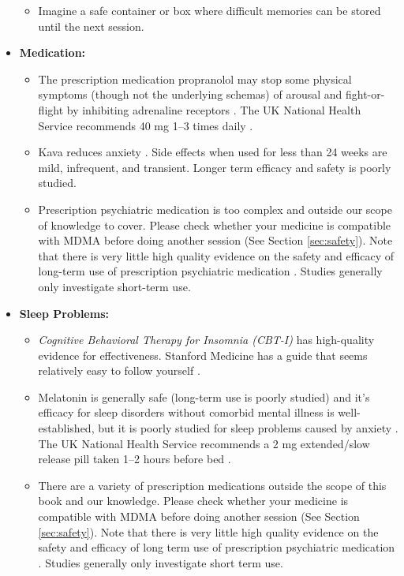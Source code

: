\documentclass[12pt,letterpaper]{book}
\begin{document}
\begin{itemize}
\begin{itemize}
        \item Imagine a safe container or box where difficult memories can be stored until the next session.
    \end{itemize}
    \item \textbf{Medication:}
    \begin{itemize}
        \item The prescription medication propranolol may stop some physical symptoms (though not the underlying schemas) of arousal and fight-or-flight by inhibiting adrenaline receptors \cite{steenenPropranalol}. The UK National Health Service recommends 40 mg 1–3 times daily \cite{nhsPropranalol}.
        \item Kava reduces anxiety \cite{Pittler03kava}. Side effects when used for less than 24 weeks are mild, infrequent, and transient. Longer term efficacy and safety is poorly studied.
        \item Prescription psychiatric medication is too complex and outside our scope of knowledge to cover. Please check whether your medicine is compatible with MDMA before doing another session (See Section \ref{sec:safety}). Note that there is very little high quality evidence on the safety and efficacy of long-term use of prescription psychiatric medication \cite{leuchtDecline}. Studies generally only investigate short-term use.
    \end{itemize}
    \item \textbf{Sleep Problems:}
    \begin{itemize}
        \item \textit{Cognitive Behavioral Therapy for Insomnia (CBT-I)} has high-quality evidence for effectiveness. Stanford Medicine has a guide that seems relatively easy to follow yourself \cite{stanfordSleep}.
        \item Melatonin is generally safe (long-term use is poorly studied) and it's efficacy for sleep disorders without comorbid mental illness is well-established, but it is poorly studied for sleep problems caused by anxiety \cite{moon2022role}. The UK National Health Service recommends a 2 mg extended/slow release pill taken 1–2 hours before bed \cite{nhsMelatonin}.
        \item There are a variety of prescription medications outside the scope of this book and our knowledge. Please check whether your medicine is compatible with MDMA before doing another session (See Section \ref{sec:safety}). Note that there is very little high quality evidence on the safety and efficacy of long term use of prescription psychiatric medication \cite{leuchtDecline}. Studies generally only investigate short term use.

\end{itemize}
\end{itemize}
\end{document}
